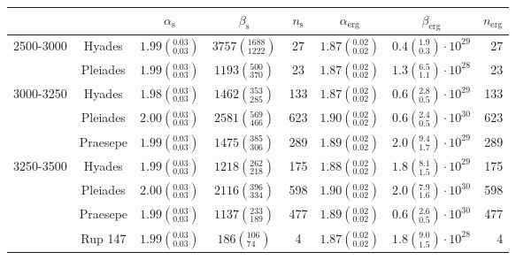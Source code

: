 \begin{tabular}{lccccccr}
\hline
          &         &                $\alpha_\mathrm{s}$ &                 $\beta_\mathrm{s}$ & $n_\mathrm{s}$ &              $\alpha_\mathrm{erg}$ &                          $\beta_\mathrm{erg}$ & $n_\mathrm{erg}$ \\
\hline
2500-3000 & Hyades &  $1.99\left(^{0.03}_{0.03}\right)$ &  $3757\left(^{1688}_{1222}\right)$ &             27 &  $1.87\left(^{0.02}_{0.02}\right)$ &   $0.4\left(^{1.9}_{0.3}\right)\cdot 10^{29}$ &               27 \\
          & Pleiades &  $1.99\left(^{0.03}_{0.03}\right)$ &    $1193\left(^{500}_{370}\right)$ &             23 &  $1.87\left(^{0.02}_{0.02}\right)$ &   $1.3\left(^{6.5}_{1.1}\right)\cdot 10^{28}$ &               23 \\
3000-3250 & Hyades &  $1.98\left(^{0.03}_{0.03}\right)$ &    $1462\left(^{353}_{285}\right)$ &            133 &  $1.87\left(^{0.02}_{0.02}\right)$ &   $0.6\left(^{2.8}_{0.5}\right)\cdot 10^{29}$ &              133 \\
          & Pleiades &  $2.00\left(^{0.03}_{0.03}\right)$ &    $2581\left(^{569}_{466}\right)$ &            623 &  $1.90\left(^{0.02}_{0.02}\right)$ &   $0.6\left(^{2.4}_{0.5}\right)\cdot 10^{30}$ &              623 \\
          & Praesepe &  $1.99\left(^{0.03}_{0.03}\right)$ &    $1475\left(^{385}_{306}\right)$ &            289 &  $1.89\left(^{0.02}_{0.02}\right)$ &   $2.0\left(^{9.4}_{1.7}\right)\cdot 10^{29}$ &              289 \\
3250-3500 & Hyades &  $1.99\left(^{0.03}_{0.03}\right)$ &    $1218\left(^{262}_{218}\right)$ &            175 &  $1.88\left(^{0.02}_{0.02}\right)$ &   $1.8\left(^{8.1}_{1.5}\right)\cdot 10^{29}$ &              175 \\
          & Pleiades &  $2.00\left(^{0.03}_{0.03}\right)$ &    $2116\left(^{396}_{334}\right)$ &            598 &  $1.90\left(^{0.02}_{0.02}\right)$ &   $2.0\left(^{7.9}_{1.6}\right)\cdot 10^{30}$ &              598 \\
          & Praesepe &  $1.99\left(^{0.03}_{0.03}\right)$ &    $1137\left(^{233}_{189}\right)$ &            477 &  $1.89\left(^{0.02}_{0.02}\right)$ &   $0.6\left(^{2.6}_{0.5}\right)\cdot 10^{30}$ &              477 \\
          & Rup 147 &  $1.99\left(^{0.03}_{0.03}\right)$ &      $186\left(^{106}_{74}\right)$ &              4 &  $1.87\left(^{0.02}_{0.02}\right)$ &   $1.8\left(^{9.0}_{1.5}\right)\cdot 10^{28}$ &                4 \\

\end{tabular}
